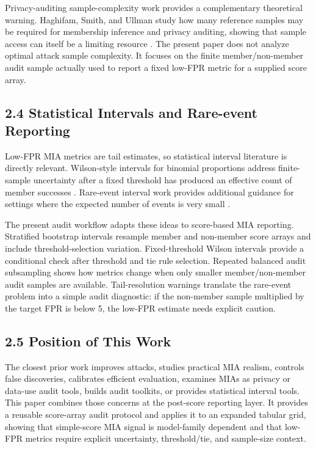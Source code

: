 \documentclass[
  10pt,
  twocolumn]{article}
\begin{document}
Privacy-auditing sample-complexity work provides a complementary theoretical warning. Haghifam, Smith, and Ullman study how many reference samples may be required for membership inference and privacy auditing, showing that sample access can itself be a limiting resource \cite{ref-16}. The present paper does not analyze optimal attack sample complexity. It focuses on the finite member/non-member audit sample actually used to report a fixed low-FPR metric for a supplied score array.

\hypertarget{statistical-intervals-and-rare-event-reporting}{%
\subsection{2.4 Statistical Intervals and Rare-event Reporting}\label{statistical-intervals-and-rare-event-reporting}}

Low-FPR MIA metrics are tail estimates, so statistical interval literature is directly relevant. Wilson-style intervals for binomial proportions address finite-sample uncertainty after a fixed threshold has produced an effective count of member successes \cite{ref-9}. Rare-event interval work provides additional guidance for settings where the expected number of events is very small \cite{ref-10}.

The present audit workflow adapts these ideas to score-based MIA reporting. Stratified bootstrap intervals resample member and non-member score arrays and include threshold-selection variation. Fixed-threshold Wilson intervals provide a conditional check after threshold and tie rule selection. Repeated balanced audit subsampling shows how metrics change when only smaller member/non-member audit samples are available. Tail-resolution warnings translate the rare-event problem into a simple audit diagnostic: if the non-member sample multiplied by the target FPR is below 5, the low-FPR estimate needs explicit caution.

\hypertarget{position-of-this-work}{%
\subsection{2.5 Position of This Work}\label{position-of-this-work}}

The closest prior work improves attacks, studies practical MIA realism, controls false discoveries, calibrates efficient evaluation, examines MIAs as privacy or data-use audit tools, builds audit toolkits, or provides statistical interval tools. This paper combines those concerns at the post-score reporting layer. It provides a reusable score-array audit protocol and applies it to an expanded tabular grid, showing that simple-score MIA signal is model-family dependent and that low-FPR metrics require explicit uncertainty, threshold/tie, and sample-size context.
\end{document}
